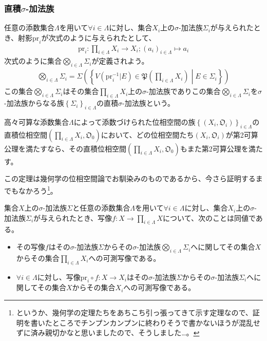 \documentclass[dvipdfmx]{jsarticle}
\begin{document}
\subsubsection{直積$\sigma$-加法族}%
\begin{dfn}\label{直積σ-加法族}
任意の添数集合$\varLambda$を用いて$\forall i \in \varLambda$に対し、集合$X_{i}$上の$\sigma$-加法族$\varSigma_{i}$が与えられたとき、射影$\mathrm{pr}_{i}$が次式のように与えられたとして、
\begin{align*}
\mathrm{pr}_{i}:\prod_{i \in \varLambda} X_{i} \rightarrow X_{i};\left( a_{i} \right)_{i \in \varLambda} \mapsto a_{i}
\end{align*}
次式のように集合$\bigotimes_{i \in \varLambda} \varSigma_{i}$が定義されよう。
\begin{align*}
\bigotimes_{i \in \varLambda} \varSigma_{i} = \varSigma\left( \left\{ V\left( \mathrm{pr}_{i}^{- 1}|E \right)\in \mathfrak{P}\left( \prod_{i \in \varLambda} X_{i} \right) \middle| E \in \varSigma_{i} \right\} \right)
\end{align*}
この集合$\bigotimes_{i \in \varLambda} \varSigma_{i}$はその集合$\prod_{i \in \varLambda} X_{i}$上の$\sigma$-加法族でありこの集合$\bigotimes_{i \in \varLambda} \varSigma_{i}$を$\sigma$-加法族からなる族$\left\{ \varSigma_{i} \right\}_{i \in \varLambda}$の直積$\sigma$-加法族という。
\end{dfn}
\begin{thm}\label{4.5.5.4}
高々可算な添数集合$\varLambda$によって添数づけられた位相空間の族$\left\{ \left( X_{i},\mathfrak{O}_{i} \right) \right\}_{i \in \varLambda }$の直積位相空間$\left( \prod_{i \in \varLambda } X_{i},\mathfrak{O}_{0} \right)$において、どの位相空間たち$\left( X_{i},\mathfrak{O}_{i} \right)$が第2可算公理を満たすなら、その直積位相空間$\left( \prod_{i \in \varLambda } X_{i},\mathfrak{O}_{0} \right)$もまた第2可算公理を満たす。
\end{thm}\par
この定理は幾何学の位相空間論でお馴染みのものであるから、今さら証明するまでもなかろう\footnote{というか、幾何学の定理たちをあちこち引っ張ってきて示す定理なので、証明を書いたところでチンプンカンプンに終わりそうで書かないほうが混乱せずに済み親切かなと思いましたので、そうしました…。}。
\begin{thm}\label{4.5.5.5}
集合$X$上の$\sigma$-加法族$\varSigma$と任意の添数集合$\varLambda$を用いて$\forall i \in \varLambda$に対し、集合$X_{i}$上の$\sigma$-加法族$\varSigma_{i}$が与えられたとき、写像$f:X \rightarrow \prod_{i \in \varLambda} X$について、次のことは同値である。
\begin{itemize}
\item
  その写像$f$はその$\sigma$-加法族$\varSigma$からその$\sigma$-加法族$\bigotimes_{i \in \varLambda} \varSigma_{i}$へに関してその集合$X$からその集合$\prod_{i \in \varLambda} X_{i}$への可測写像である。
\item
  $\forall i \in \varLambda$に対し、写像$\mathrm{pr}_{i} \circ f:X \rightarrow X_{i}$はその$\sigma$-加法族$\varSigma$からその$\sigma$-加法族$\varSigma_{i}$へに関してその集合$X$からその集合$X_{i}$への可測写像である。
\end{itemize}
\end{thm}
\end{document}
